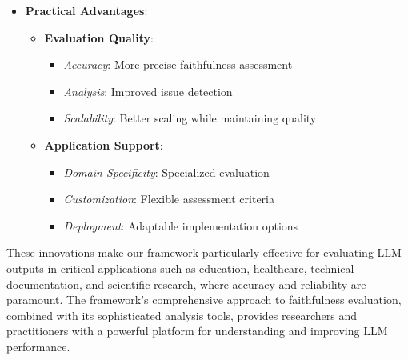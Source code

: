 \begin{itemize}
    \item \textbf{Practical Advantages}:
    \begin{itemize}
        \item \textbf{Evaluation Quality}:
        \begin{itemize}
            \item \textit{Accuracy}: More precise faithfulness assessment
            \item \textit{Analysis}: Improved issue detection
            \item \textit{Scalability}: Better scaling while maintaining quality
        \end{itemize}
        \item \textbf{Application Support}:
        \begin{itemize}
            \item \textit{Domain Specificity}: Specialized evaluation
            \item \textit{Customization}: Flexible assessment criteria
            \item \textit{Deployment}: Adaptable implementation options
        \end{itemize}
    \end{itemize}
\end{itemize}

\vspace{0.5em}
These innovations make our framework particularly effective for evaluating LLM outputs in critical applications such as education, healthcare, technical documentation, and scientific research, where accuracy and reliability are paramount. The framework's comprehensive approach to faithfulness evaluation, combined with its sophisticated analysis tools, provides researchers and practitioners with a powerful platform for understanding and improving LLM performance.